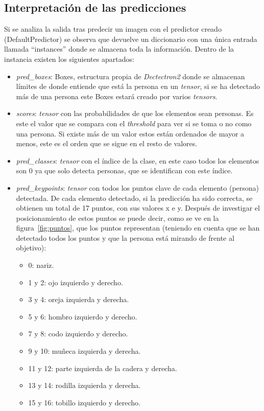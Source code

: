 \subsection{Interpretación de las predicciones}
Si se analiza la salida tras predecir un imagen con el predictor creado (DefaultPredictor) se observa que devuelve un diccionario con una única entrada llamada ``instances'' donde se almacena toda la información. Dentro de la instancia existen los siguientes apartados:
\begin{itemize}
	\item \textit{pred\_boxes}: Boxes, estructura propia de \textit{Dectectron2} donde se almacenan límites de donde entiende que está la persona en un \textit{tensor}, si se ha detectado más de una persona este Boxes estará creado por varios \textit{tensors}.
	\item \textit{scores}: \textit{tensor} con las probabilidades de que los elementos sean personas. Es este el valor que se compara con el \textit{threshold} para ver si se toma o no como una persona. Si existe más de un valor estos están ordenados de mayor a menos, este es el orden que se sigue en el resto de valores.
	\item \textit{pred\_classes}: \textit{tensor} con el índice de la clase, en este caso todos los elementos son 0 ya que solo detecta personas, que se identifican con este índice.
	\item \textit{pred\_keypoints}: \textit{tensor} con todos los puntos clave de cada elemento (persona) detectada. De cada elemento detectado, si la predicción ha sido correcta, se obtienen un total de 17 puntos, con sus valores x e y. Después de investigar el posicionamiento de estos puntos se puede decir, como se ve en la figura~\ref{fig:puntos}, que los puntos representan (teniendo en cuenta que se han detectado todos los puntos y que la persona está mirando de frente al objetivo):
	\begin{itemize}
		\item 0: nariz.
		\item 1 y 2: ojo izquierdo y derecho.
		\item 3 y 4: oreja izquierda y derecha.
		\item 5 y 6: hombro izquierdo y derecho.
		\item 7 y 8: codo izquierdo y derecho.
		\item 9 y 10: muñeca izquierda y derecha.
		\item 11 y 12: parte izquierda de la cadera y derecha.
		\item 13 y 14: rodilla izquierda y derecha.
		\item 15 y 16: tobillo izquierdo y derecho.
	\end{itemize}
\end{itemize}

